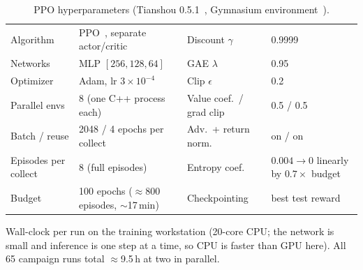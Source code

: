 \documentclass[11pt,a4paper]{article}
\begin{document}
\begin{table}[t]
\centering\small
\begin{threeparttable}
\caption{PPO hyperparameters (Tianshou 0.5.1~\cite{weng2022tianshou},
Gymnasium environment~\cite{towers2024gymnasium}).}
\label{tab:hyper}
\begin{tabular}{llll}
\toprule
Algorithm & PPO~\cite{schulman2017ppo}, separate actor/critic & Discount $\gamma$ & 0.9999 \\
Networks & MLP $[256,128,64]$ & GAE $\lambda$~\cite{schulman2016gae} & 0.95 \\
Optimizer & Adam, lr $3\times10^{-4}$ & Clip $\epsilon$ & 0.2 \\
Parallel envs & 8 (one C++ process each) & Value coef.\ / grad clip & 0.5 / 0.5 \\
Batch / reuse & 2048 / 4 epochs per collect & Adv.\ + return norm. & on / on \\
Episodes per collect & 8 (full episodes) & Entropy coef. & $0.004 \to 0$ linearly by $0.7\times$ budget \\
Budget & 100 epochs ($\approx$800 episodes, $\sim$17\,min)\tnote{a} & Checkpointing & best test reward \\
\bottomrule
\end{tabular}
\begin{tablenotes}\footnotesize
\item[a] Wall-clock per run on the training workstation (20-core CPU; the
network is small and inference is one step at a time, so CPU is faster than
GPU here). All 65 campaign runs total $\approx$9.5\,h at two in parallel.
\end{tablenotes}
\end{threeparttable}
\end{table}
\end{document}
